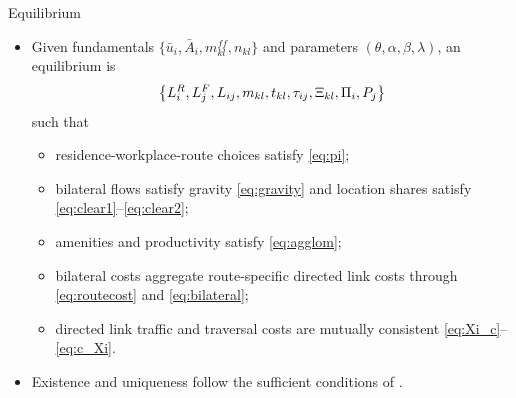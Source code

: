 \documentclass[11pt,aspectratio=169]{beamer}
\newcommand{\app}[1]{\allowbreak\hspace{0.25em}\hyperlink{#1}{\beamergotobutton{details}}}
\begin{document}
\begin{frame}[label=equilibrium]{Equilibrium}
\begin{itemize}\footnotesize
  \item Given fundamentals $\{\bar u_i,\bar A_i,m_{kl}^{ff},n_{kl}\}$ and parameters $(\theta,\alpha,\beta,\lambda)$, an equilibrium is
  \vspace{-0.45em}\begin{equation}
    \left\{L_i^R,L_j^F,L_{ij},m_{kl},t_{kl},\tau_{ij},\Xi_{kl},\Pi_i,P_j\right\}
  \vspace{-0.55em}\end{equation}
  such that
  \begin{itemize}\scriptsize
    \item residence-workplace-route choices satisfy \eqref{eq:pi};
    \item bilateral flows satisfy gravity \eqref{eq:gravity} and location shares satisfy \eqref{eq:clear1}--\eqref{eq:clear2};
    \item amenities and productivity satisfy \eqref{eq:agglom};
    \item bilateral costs aggregate route-specific directed link costs through \eqref{eq:routecost} and \eqref{eq:bilateral};
    \item directed link traffic and traversal costs are mutually consistent \eqref{eq:Xi_c}--\eqref{eq:c_Xi}.
  \end{itemize}
  \item Existence and uniqueness follow the sufficient conditions of \citet[Proposition~1]{allenarkolakis2022}. \app{appexist}
\end{itemize}
\end{frame}

\end{document}
